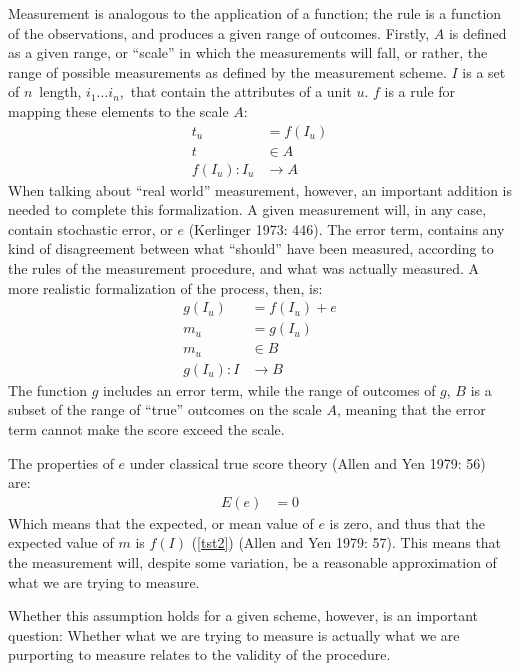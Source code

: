 \documentclass[12pt,twoside]{reedthesis}
\begin{document}
Measurement is analogous to the application of a function; the rule is a
function of the observations, and produces a given range of outcomes.
Firstly, \(A\) is defined as a given range, or ``scale'' in which the
measurements will fall, or rather, the range of possible measurements as
defined by the measurement scheme. \(I\) is a set of \(n\)~length,
\(i_1...i_n\),~that contain the attributes of a unit \(u\). \(f\) is a
rule for mapping these elements to the scale \(A\):
\begin{align}
t_u &= f(I_u) \label{measurement}\\
t &\in A \label{range}\\
f(I_u): I_u &\to A \label{mapping}
\end{align}
When talking about ``real world'' measurement, however, an important
addition is needed to complete this formalization. A given measurement
will, in any case, contain stochastic error, or \(e\) (Kerlinger 1973:
446). The error term, contains any kind of disagreement between what
``should'' have been measured, according to the rules of the measurement
procedure, and what was actually measured. A more realistic
formalization of the process, then, is:
\begin{align}
g(I_u) &= f(I_u) + e\label{errorFunc}\\
m_u &= g(I_u)\label{errMeasure}\\
m_u &\in B\label{errRange}\\
g(I_u): I &\to B\label{errMap}
\end{align}
The function \(g\) includes an error term, while the range of outcomes
of \(g\), \(B\) is a subset of the range of ``true'' outcomes on the
scale \(A\), meaning that the error term cannot make the score exceed
the scale.

The properties of \(e\) under classical true score theory (Allen and Yen
1979: 56) are:
\begin{align}
E(e) &= 0\label{expError}
\end{align}
Which means that the expected, or mean value of \(e\) is zero, and thus
that the expected value of \(m\) is \(f(I)\) (\ref{tst2}) (Allen and Yen
1979: 57). This means that the measurement will, despite some variation,
be a reasonable approximation of what we are trying to measure.

Whether this assumption holds for a given scheme, however, is an
important question: Whether what we are trying to measure is actually
what we are purporting to measure relates to the validity of the
procedure.
\end{document}
